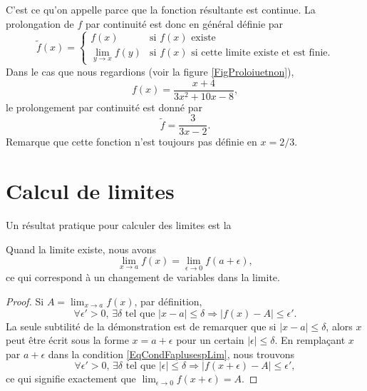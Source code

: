 C'est ce qu'on appelle  parce que la fonction résultante est continue. La prolongation de $f$ par continuité est donc en général définie par
\begin{equation}
\tilde f(x)=
\begin{cases}
f(x)			&\text{si $f(x)$ existe}\\
\lim_{y\to x}f(y)	&\text{si $f(x)$ si cette limite existe et est finie.}
\end{cases}
\end{equation}
Dans le cas que nous regardions (voir la figure \ref{FigProloiuetnon}),
\[ 
	f(x)=\frac{ x+4 }{ 3x^2+10x-8 },
\]
le prolongement par continuité est donné par
\begin{equation}
\tilde f =\frac{ 3 }{ 3x-2 }.
\end{equation}
Remarque que cette fonction n'est toujours pas définie en $x=2/3$. 


\section{Calcul de limites}

Un résultat pratique pour calculer des limites est la
\begin{proposition}		\label{PropChmVarLim}
Quand la limite existe, nous avons
\[ 
  \lim_{x\to a}f(x)=\lim_{\epsilon\to 0}f(a+\epsilon),
\]
ce qui correspond à un \og changement de variables\fg{} dans la limite.
\end{proposition}

\begin{proof}
Si $A=\lim_{x\to a}f(x)$, par définition,
\begin{equation}		\label{EqCondFaplusespLim}
\forall\epsilon'>0,\,\exists\delta\text{ tel que }| x-a |\leq\delta\Rightarrow| f(x)-A |\leq\epsilon'.
\end{equation}
La seule subtilité de la démonstration est de remarquer que si $| x-a |\leq\delta$, alors $x$ peut être écrit sous la forme $x=a+\epsilon$ pour un certain $| \epsilon |\leq\delta$. En remplaçant $x$ par $a+\epsilon$ dans la condition \ref{EqCondFaplusespLim}, nous trouvons 
\begin{equation}
\forall\epsilon'>0,\,\exists\delta\text{ tel que }| \epsilon |\leq\delta\Rightarrow| f(x+\epsilon)-A |\leq\epsilon',
\end{equation}
ce qui signifie exactement que $\lim_{\epsilon\to 0}f(x+\epsilon)=A$.	
\end{proof}

